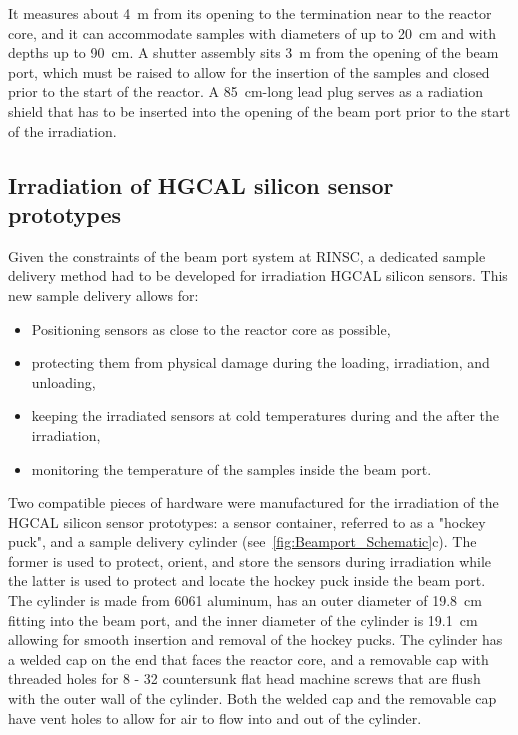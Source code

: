It measures about \SI{4}{\metre} from its opening to the termination near to the reactor core, and it can accommodate samples with diameters of up to \SI{20}{\centi\metre} and with depths up to \SI{90}{\centi\metre}.
A shutter assembly sits \SI{3}{\metre} from the opening of the beam port, which must be raised to allow for the insertion of the samples and closed prior to the start of the reactor.
A \SI{85}{\centi\metre}-long lead plug serves as a radiation shield that has to be inserted into the opening of the beam port prior to the start of the irradiation.

\subsection{Irradiation of HGCAL silicon sensor prototypes}
\label{subsec:irradiation}
Given the constraints of the beam port system at RINSC, a dedicated sample delivery method had to be developed for irradiation HGCAL silicon sensors.
This new sample delivery allows for:
\begin{itemize}
  \item Positioning sensors as close to the reactor core as possible,
  \item protecting them from physical damage during the loading, irradiation, and unloading,
  \item keeping the irradiated sensors at cold temperatures during and the after the irradiation,
  \item monitoring the temperature of the samples inside the beam port.
\end{itemize}
Two compatible pieces of hardware were manufactured for the irradiation of the HGCAL silicon sensor prototypes: a sensor container, referred to as a "hockey puck", and a sample delivery cylinder (see~\ref{fig:Beamport_Schematic}c). 
The former is used to protect, orient, and store the sensors during irradiation while the latter is used to protect and locate the hockey puck inside the beam port.
The cylinder is made from 6061 aluminum, has an outer diameter of \SI{19.8}{\centi\metre} fitting into the beam port, and the inner diameter of the cylinder is \SI{19.1}{\centi\metre} allowing for smooth insertion and removal of the hockey pucks.
The cylinder has a welded cap on the end that faces the reactor core, and a removable cap with threaded holes for 8 - 32 countersunk flat head machine screws that are flush with the outer wall of the cylinder. 
Both the welded cap and the removable cap have vent holes to allow for air to flow into and out of the cylinder.
